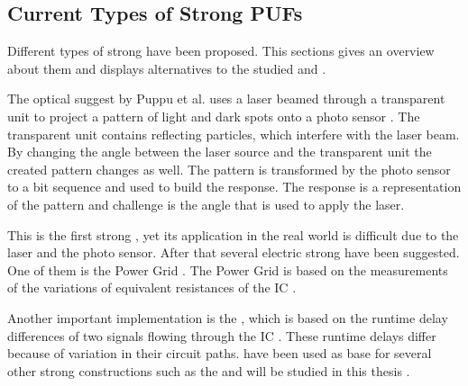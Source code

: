 
\subsection{Current Types of Strong PUFs}
\label{sec:typesofpufs}

Different types of strong \pufs have been proposed.
This sections gives an overview about them and displays alternatives to the studied \apuf and \xpuf. 

The optical \puf suggest by Puppu et al. uses a laser beamed through a transparent unit to project a pattern of light and dark spots onto a photo sensor \cite{Pappu2001PhysicalFunctions}.
The transparent unit contains reflecting particles, which interfere with the laser beam.
By changing the angle between the laser source and the transparent unit the created pattern changes as well.
The pattern is transformed by the photo sensor to a bit sequence and used to build the response.
The \puf response is a representation of the pattern and challenge is the angle that is used to apply the laser.

This is the first strong \puf, yet its application in the real world is difficult due to the laser and the photo sensor.
After that several electric strong \puf have been suggested. %
One of them is the Power Grid \puf.
The Power Grid \puf is based on the measurements of the variations of equivalent resistances of the \ac{IC} \cite{Helinski2009AVariations}.

Another important implementation is the \apuf, which is based on the runtime delay differences of two signals flowing through the \ac{IC}  \cite{Ruhrmair2010StrongProofs}.
These runtime delays differ because of variation in their circuit paths.
\apufs have been used as base for several other strong \puf constructions such as the \xpuf and will be studied in this thesis \cite{Becker2015ThePUFs}.

